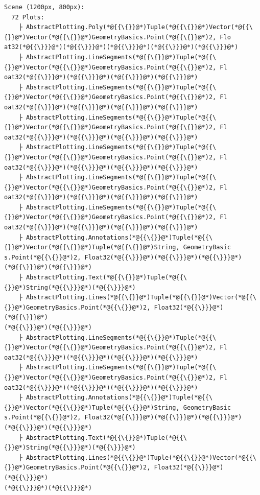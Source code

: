 \documentclass[12pt,a4paper]{article}
\begin{document}
\begin{lstlisting}
Scene (1200px, 800px):
  72 Plots:
    ├ AbstractPlotting.Poly(*@{{\{}}@*)Tuple(*@{{\{}}@*)Vector(*@{{\{}}@*)Vector(*@{{\{}}@*)GeometryBasics.Point(*@{{\{}}@*)2, Flo
at32(*@{{\}}}@*)(*@{{\}}}@*)(*@{{\}}}@*)(*@{{\}}}@*)(*@{{\}}}@*)
    ├ AbstractPlotting.LineSegments(*@{{\{}}@*)Tuple(*@{{\{}}@*)Vector(*@{{\{}}@*)GeometryBasics.Point(*@{{\{}}@*)2, Fl
oat32(*@{{\}}}@*)(*@{{\}}}@*)(*@{{\}}}@*)(*@{{\}}}@*)
    ├ AbstractPlotting.LineSegments(*@{{\{}}@*)Tuple(*@{{\{}}@*)Vector(*@{{\{}}@*)GeometryBasics.Point(*@{{\{}}@*)2, Fl
oat32(*@{{\}}}@*)(*@{{\}}}@*)(*@{{\}}}@*)(*@{{\}}}@*)
    ├ AbstractPlotting.LineSegments(*@{{\{}}@*)Tuple(*@{{\{}}@*)Vector(*@{{\{}}@*)GeometryBasics.Point(*@{{\{}}@*)2, Fl
oat32(*@{{\}}}@*)(*@{{\}}}@*)(*@{{\}}}@*)(*@{{\}}}@*)
    ├ AbstractPlotting.LineSegments(*@{{\{}}@*)Tuple(*@{{\{}}@*)Vector(*@{{\{}}@*)GeometryBasics.Point(*@{{\{}}@*)2, Fl
oat32(*@{{\}}}@*)(*@{{\}}}@*)(*@{{\}}}@*)(*@{{\}}}@*)
    ├ AbstractPlotting.LineSegments(*@{{\{}}@*)Tuple(*@{{\{}}@*)Vector(*@{{\{}}@*)GeometryBasics.Point(*@{{\{}}@*)2, Fl
oat32(*@{{\}}}@*)(*@{{\}}}@*)(*@{{\}}}@*)(*@{{\}}}@*)
    ├ AbstractPlotting.LineSegments(*@{{\{}}@*)Tuple(*@{{\{}}@*)Vector(*@{{\{}}@*)GeometryBasics.Point(*@{{\{}}@*)2, Fl
oat32(*@{{\}}}@*)(*@{{\}}}@*)(*@{{\}}}@*)(*@{{\}}}@*)
    ├ AbstractPlotting.Annotations(*@{{\{}}@*)Tuple(*@{{\{}}@*)Vector(*@{{\{}}@*)Tuple(*@{{\{}}@*)String, GeometryBasic
s.Point(*@{{\{}}@*)2, Float32(*@{{\}}}@*)(*@{{\}}}@*)(*@{{\}}}@*)(*@{{\}}}@*)(*@{{\}}}@*)
    ├ AbstractPlotting.Text(*@{{\{}}@*)Tuple(*@{{\{}}@*)String(*@{{\}}}@*)(*@{{\}}}@*)
    ├ AbstractPlotting.Lines(*@{{\{}}@*)Tuple(*@{{\{}}@*)Vector(*@{{\{}}@*)GeometryBasics.Point(*@{{\{}}@*)2, Float32(*@{{\}}}@*)(*@{{\}}}@*)
(*@{{\}}}@*)(*@{{\}}}@*)
    ├ AbstractPlotting.LineSegments(*@{{\{}}@*)Tuple(*@{{\{}}@*)Vector(*@{{\{}}@*)GeometryBasics.Point(*@{{\{}}@*)2, Fl
oat32(*@{{\}}}@*)(*@{{\}}}@*)(*@{{\}}}@*)(*@{{\}}}@*)
    ├ AbstractPlotting.LineSegments(*@{{\{}}@*)Tuple(*@{{\{}}@*)Vector(*@{{\{}}@*)GeometryBasics.Point(*@{{\{}}@*)2, Fl
oat32(*@{{\}}}@*)(*@{{\}}}@*)(*@{{\}}}@*)(*@{{\}}}@*)
    ├ AbstractPlotting.Annotations(*@{{\{}}@*)Tuple(*@{{\{}}@*)Vector(*@{{\{}}@*)Tuple(*@{{\{}}@*)String, GeometryBasic
s.Point(*@{{\{}}@*)2, Float32(*@{{\}}}@*)(*@{{\}}}@*)(*@{{\}}}@*)(*@{{\}}}@*)(*@{{\}}}@*)
    ├ AbstractPlotting.Text(*@{{\{}}@*)Tuple(*@{{\{}}@*)String(*@{{\}}}@*)(*@{{\}}}@*)
    ├ AbstractPlotting.Lines(*@{{\{}}@*)Tuple(*@{{\{}}@*)Vector(*@{{\{}}@*)GeometryBasics.Point(*@{{\{}}@*)2, Float32(*@{{\}}}@*)(*@{{\}}}@*)
(*@{{\}}}@*)(*@{{\}}}@*)

\end{lstlisting}
\end{document}
